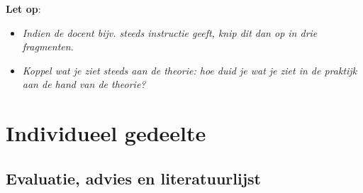 \documentclass{article}
\begin{document}
        \textbf{Let op}:
        \begin{itemize}
            \item \textit{Indien de docent bijv. steeds instructie geeft, knip dit dan op in drie fragmenten.}
            \item \textit{Koppel wat je ziet steeds aan de theorie: hoe duid je wat je ziet in de praktijk aan de hand van de theorie?}
        \end{itemize}
    \newpage
    \section{Individueel gedeelte}
        \subsection{Evaluatie, advies en literatuurlijst}
\end{document}
